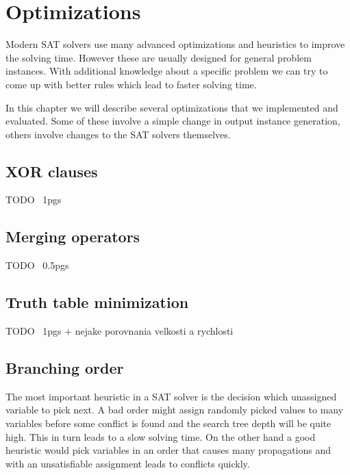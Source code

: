 \section{Optimizations}

Modern SAT solvers use many advanced optimizations and heuristics to improve the solving time.
However these are usually designed for general problem instances.
With additional knowledge about a specific problem we can try to come up with better rules which lead to faster solving time.

In this chapter we will describe several optimizations that we implemented and evaluated.
Some of these involve a simple change in output instance generation, others involve changes to the SAT solvers themselves.


\subsection{XOR clauses}
TODO ~1pgs

\subsection{Merging operators}
TODO ~0.5pgs

\subsection{Truth table minimization}
TODO ~1pgs + nejake porovnania velkosti a rychlosti

\subsection{Branching order}
\label{sec:branching-order}

The most important heuristic in a SAT solver is the decision which unassigned variable to pick next.
A bad order might assign randomly picked values to many variables before some conflict is found and the search tree depth will be quite high.
This in turn leads to a slow solving time.
On the other hand a good heuristic would pick variables in an order that causes many propagations and with an unsatisfiable assignment leads to conflicts quickly.

